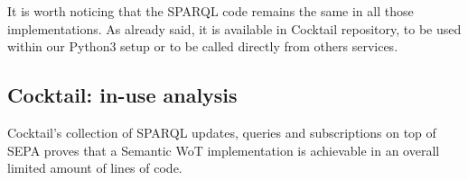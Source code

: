 It is worth noticing that the SPARQL code remains the same in all those implementations. As already said, it is available in Cocktail repository, to be used within our Python3 setup or to be called directly from others services.





\subsection{Cocktail: in-use analysis}
\label{ssec:cocktail_eval}
Cocktail's collection of SPARQL updates, queries and subscriptions on top of SEPA proves that a Semantic WoT implementation is achievable in an overall limited amount of lines of code.

